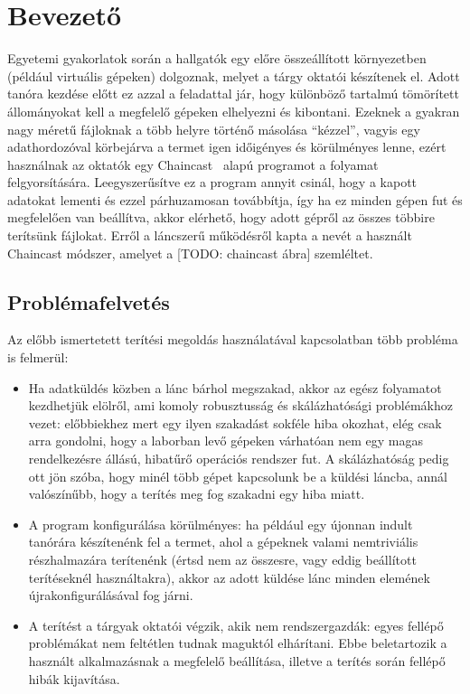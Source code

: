 \chapter{Bevezető} 

Egyetemi gyakorlatok során a hallgatók egy előre összeállított környezetben (például virtuális
gépeken) dolgoznak, melyet a tárgy oktatói készítenek el. Adott tanóra kezdése előtt 
ez azzal a feladattal jár, hogy különböző tartalmú tömörített állományokat kell a megfelelő gépeken elhelyezni és kibontani. Ezeknek a gyakran nagy méretű fájloknak a több helyre történő másolása ``kézzel'', vagyis egy adathordozóval körbejárva a termet igen időigényes és körülményes lenne, ezért használnak az oktatók egy Chaincast~\cite{kiraly2011chaincast} alapú programot a folyamat felgyorsítására. Leegyszerűsítve ez a program annyit csinál, hogy a kapott adatokat lementi és ezzel párhuzamosan továbbítja, így ha ez minden gépen fut és megfelelően van beállítva, akkor elérhető, hogy adott gépről az összes többire terítsünk fájlokat. Erről a láncszerű működésről kapta a nevét a használt Chaincast módszer, amelyet a [TODO: chaincast ábra] szemléltet.

\section{Problémafelvetés}

Az előbb ismertetett terítési megoldás használatával kapcsolatban több probléma is felmerül:

\begin{itemize}
  \item Ha adatküldés közben a lánc bárhol megszakad, akkor az egész folyamatot kezdhetjük elölről, ami komoly robusztusság és skálázhatósági problémákhoz vezet: előbbiekhez mert egy ilyen szakadást sokféle hiba okozhat, elég csak arra gondolni, hogy a laborban levő gépeken várhatóan nem egy magas rendelkezésre állású, hibatűrő operációs rendszer fut. A skálázhatóság pedig ott jön szóba, hogy minél több gépet kapcsolunk be a küldési láncba, annál valószínűbb, hogy a terítés meg fog szakadni egy hiba miatt.
   \item A program konfigurálása körülményes: ha például egy újonnan indult tanórára készítenénk fel a termet, ahol a gépeknek valami nemtriviális részhalmazára terítenénk (értsd nem az összesre, vagy eddig beállított terítéseknél használtakra), akkor az adott küldése lánc minden elemének újrakonfigurálásával fog járni.
   \item A terítést a tárgyak oktatói végzik, akik nem rendszergazdák: egyes fellépő problémákat nem feltétlen tudnak maguktól elhárítani. Ebbe beletartozik a használt alkalmazásnak a megfelelő beállítása, illetve a terítés során fellépő hibák kijavítása.
\end{itemize}

